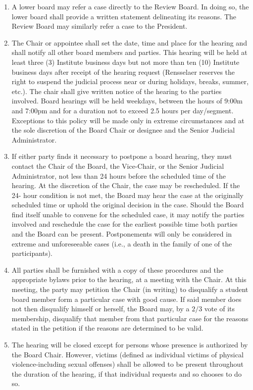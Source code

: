 \begin{enumerate}
    \item A lower board may refer a case directly to the Review Board. In doing so, the lower board shall provide a written statement delineating its reasons. The Review Board may similarly refer a case to the President.
    \item The Chair or appointee shall set the date, time and place for the hearing and shall notify all other board members and parties. This hearing will be held at least three (3) Institute business days but not more than ten (10) Institute business days after receipt of the hearing request (Rensselaer reserves the right to suspend the judicial process near or during holidays, breaks, summer, etc.). The chair shall give written notice of the hearing to the parties involved. Board hearings will be held weekdays, between the hours of 9:00m and 7:00pm and for a duration not to exceed 2.5 hours per day/segment. Exceptions to this policy will be made only in extreme circumstances and at the sole discretion of the Board Chair or designee and the Senior Judicial Administrator.
    \item If either party finds it necessary to postpone a board hearing, they must contact the Chair of the Board, the Vice-Chair, or the Senior Judicial Administrator, not less than 24 hours before the scheduled time of the hearing. At the discretion of the Chair, the case may be rescheduled. If the 24- hour condition is not met, the Board may hear the case at the originally scheduled time or uphold the original decision in the case. Should the Board find itself unable to convene for the scheduled case, it may notify the parties involved and reschedule the case for the earliest possible time both parties and the Board can be present. Postponements will only be considered in extreme and unforeseeable cases (i.e., a death in the family of one of the participants).
    \item All parties shall be furnished with a copy of these procedures and the appropriate bylaws prior to the hearing, at a meeting with the Chair. At this meeting, the party may petition the Chair (in writing) to disqualify a student board member form a particular case with good cause. If said member does not then disqualify himself or herself, the Board may, by a $2/3$ vote of its membership, disqualify that member from that particular case for the reasons stated in the petition if the reasons are determined to be valid.
    \item The hearing will be closed except for persons whose presence is authorized by the Board Chair. However, victims (defined as individual victims of physical violence-including sexual offenses) shall be allowed to be present throughout the duration of the hearing, if that individual requests and so chooses to do so.

\end{enumerate}
